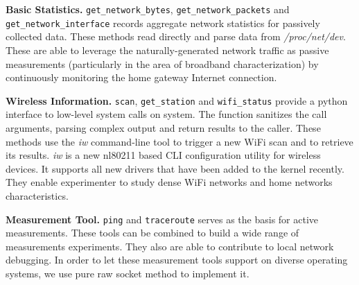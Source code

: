 {\textbf{Basic Statistics.} \texttt{get\_network\_bytes}, \texttt{get\_network\_packets} and \texttt{get\_network\_interface} records aggregate network statistics for passively collected data. These methods read directly and parse data from \emph{/proc/net/dev}. These are able to leverage the naturally-generated network traffic as passive measurements (particularly in the area of broadband characterization) by continuously monitoring the home gateway Internet connection.

\textbf{Wireless Information.} \texttt{scan}, \texttt{get\_station} and \texttt{wifi\_status} provide a python interface to low-level system calls on system. The function sanitizes the call arguments, parsing complex output and return results to the caller. These methods use the \emph{iw} command-line tool to trigger a new WiFi scan and to retrieve its results. \emph{iw} is a new nl80211 based CLI configuration utility for wireless devices. It supports all new drivers that have been added to the kernel recently\cite{iw}. They enable experimenter to study dense WiFi networks and home networks characteristics.

\textbf{Measurement Tool.} \texttt{ping} and \texttt{traceroute} serves as the basis for active measurements. These tools can be combined to build a wide range of measurements experiments. They also are able to contribute to local network debugging. In order to let these measurement tools support on diverse operating systems, we use pure raw socket method to implement it. 


}
